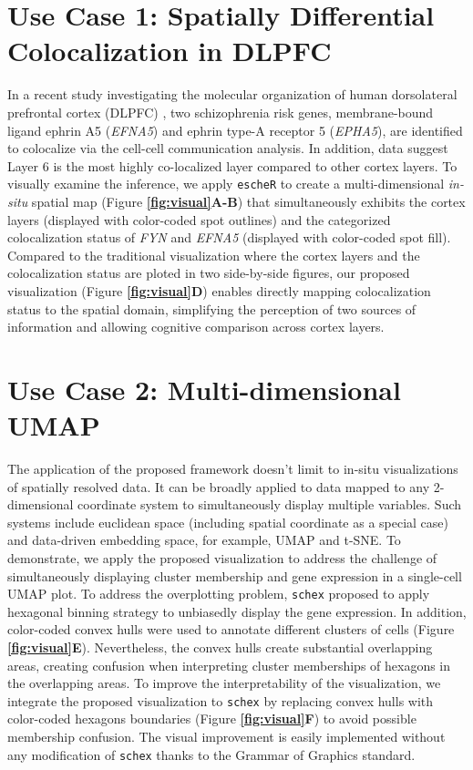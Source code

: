 \documentclass[11pt]{article}
\begin{document}
\section*{Use Case 1: Spatially Differential Colocalization in DLPFC}
In a recent study investigating the molecular organization of human dorsolateral prefrontal cortex (DLPFC) \cite{huukimyers_2023}, two schizophrenia risk genes, membrane-bound ligand ephrin A5 (\textit{EFNA5}) and ephrin type-A receptor 5 (\textit{EPHA5}), are identified to colocalize via the cell-cell communication analysis. In addition, data suggest Layer 6 is the most highly co-localized layer compared to other cortex layers. To visually examine the inference, we apply \texttt{escheR} to create a multi-dimensional \textit{in-situ} spatial map (Figure \textbf{\ref{fig:visual}A-B}) that simultaneously exhibits the cortex layers (displayed with color-coded spot outlines) and the categorized colocalization status of \textit{FYN} and \textit{EFNA5} (displayed with color-coded spot fill). Compared to the traditional visualization where the cortex layers and the colocalization status are ploted in two side-by-side figures, our proposed visualization (Figure \textbf{\ref{fig:visual}D}) enables directly mapping colocalization status to the spatial domain, simplifying the perception of two sources of information and allowing cognitive comparison across cortex layers. 

\section*{Use Case 2: Multi-dimensional UMAP}
The application of the proposed framework doesn't limit to in-situ visualizations of spatially resolved data. It can be broadly applied to data mapped to any 2-dimensional coordinate system to simultaneously display multiple variables. Such systems include euclidean space (including spatial coordinate as a special case) and data-driven embedding space, for example, UMAP and t-SNE. To demonstrate, we apply the proposed visualization to address the challenge of simultaneously displaying cluster membership and gene expression in a single-cell UMAP plot. To address the overplotting problem, \texttt{schex} proposed to apply hexagonal binning strategy to unbiasedly display the gene expression.\cite{freytag_2020} In addition, color-coded convex hulls were used to annotate different clusters of cells (Figure \textbf{\ref{fig:visual}E}). Nevertheless, the convex hulls create substantial overlapping areas, creating confusion when interpreting cluster memberships of hexagons in the overlapping areas. To improve the interpretability of the visualization, we integrate the proposed visualization to \texttt{schex} by replacing convex hulls with color-coded hexagons boundaries  (Figure \textbf{\ref{fig:visual}F}) to avoid possible membership confusion. The visual improvement is easily implemented without any modification of \texttt{schex} thanks to the Grammar of Graphics \cite{wilkinson_2012} standard.
\end{document}
